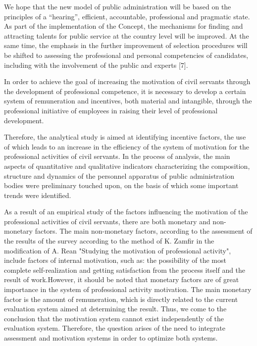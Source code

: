 \begin{multicols}{2}
We hope that the new model of public administration will be based on the
principles of a ``hearing'', efficient, accountable, professional and
pragmatic state. As part of the implementation of the Concept, the
mechanisms for finding and attracting talents for public service at the
country level will be improved. At the same time, the emphasis in the
further improvement of selection procedures will be shifted to assessing
the professional and personal competencies of candidates, including with
the involvement of the public and experts {[}7{]}.

In order to achieve the goal of increasing the motivation of civil
servants through the development of professional competence, it is
necessary to develop a certain system of remuneration and incentives,
both material and intangible, through the professional initiative of
employees in raising their level of professional development.

Therefore, the analytical study is aimed at identifying incentive
factors, the use of which leads to an increase in the efficiency of the
system of motivation for the professional activities of civil servants.
In the process of analysis, the main aspects of quantitative and
qualitative indicators characterizing the composition, structure and
dynamics of the personnel apparatus of public administration bodies were
preliminary touched upon, on the basis of which some important trends
were identified.

As a result of an empirical study of the factors influencing the
motivation of the professional activities of civil servants, there are
both monetary and non-monetary factors. The main non-monetary factors,
according to the assessment of the results of the survey according to
the method of K. Zamfir in the modification of A. Rean "Studying the
motivation of professional activity", include factors of internal
motivation, such as: the possibility of the most complete
self-realization and getting satisfaction from the process itself and
the result of work.However, it should be noted that monetary factors are
of great importance in the system of professional activity motivation.
The main monetary factor is the amount of remuneration, which is
directly related to the current evaluation system aimed at determining
the result. Thus, we come to the conclusion that the motivation system
cannot exist independently of the evaluation system. Therefore, the
question arises of the need to integrate assessment and motivation
systems in order to optimize both systems.


\end{multicols}
